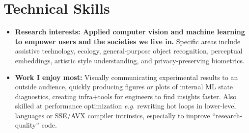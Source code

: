 \documentclass[10pt,letterpaper]{article}
\begin{document}
\section*{Technical Skills}
\vspace{-4pt}
\begin{itemize}
\item \textbf{Research interests: Applied computer vision and machine learning to empower users and the societies we live in.} Specific areas include assistive technology, ecology, general-purpose object recognition, perceptual embeddings, artistic style understanding, and privacy-preserving biometrics.
\item \textbf{Work I enjoy most:} Visually communicating experimental results to an outside audience, quickly producing figures or plots of internal ML state diagnostics, creating infra+tools for engineers to find insights faster. Also skilled at performance optimization \emph{e.g.} rewriting hot loops in lower-level languages or SSE/AVX compiler intrinsics, especially to improve ``research-quality'' code.


\end{itemize}
\end{document}
